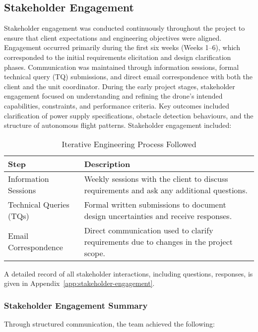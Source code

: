 \subsection{Stakeholder Engagement}
Stakeholder engagement was conducted continuously throughout the project to ensure that client expectations and engineering objectives were aligned. Engagement occurred primarily during the first six weeks (Weeks 1–6), which corresponded to the initial requirements elicitation and design clarification phases. Communication was maintained through information sessions, formal technical query (TQ) submissions, and direct email correspondence with both the client and the unit coordinator. During the early project stages, stakeholder engagement focused on understanding and refining the drone’s intended capabilities, constraints, and performance criteria. Key outcomes included clarification of power supply specifications, obstacle detection behaviours, and the structure of autonomous flight patterns. Stakeholder engagement included:

\begin{table}[H]
\centering
\caption{Iterative Engineering Process Followed}
\begin{tabular}{|p{3cm}|p{10cm}|}
\hline
\textbf{Step} & \textbf{Description} \\ \hline
Information Sessions & Weekly sessions with the client to discuss requirements and ask any additional questions. \\ \hline
Technical Queries (TQs) & Formal written submissions to document design uncertainties and receive responses. \\ \hline
Email Correspondence & Direct communication used to clarify requirements due to changes in the project scope. \\ \hline
\end{tabular}
\end{table}

A detailed record of all stakeholder interactions, including questions, responses, is given in Appendix~\ref{app:stakeholder-engagement}.

\subsubsection{Stakeholder Engagement Summary} \leavevmode

Through structured communication, the team achieved the following: \

